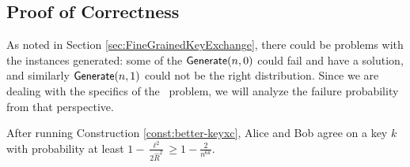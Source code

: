 \subsection{Proof of Correctness}
As noted in Section \ref{sec:FineGrainedKeyExchange}, there could be problems with the instances generated: some of the $\mathsf{Generate}(n,0)$ could fail and have a solution, and similarly $\mathsf{Generate}(n,1)$ could not be the right distribution. Since we are dealing with the specifics of the \zkclique~problem, we will analyze the failure probability from that perspective.

\begin{lemma}\label{lem:zkc-keyxc-correct}
	After running Construction \ref{const:better-keyxc}, Alice and Bob agree on a key $k$ with probability at least $1 - \frac{\ell^2}{2\hat R^2} \ge 1 - \frac{2}{n^{6k}}$.
\end{lemma}
